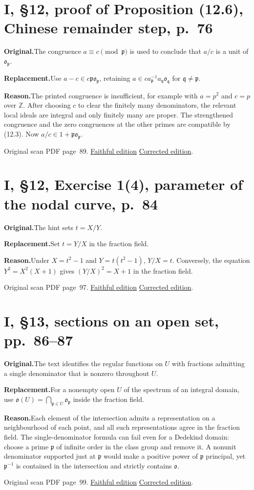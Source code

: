 \documentclass[11pt,a4paper]{article}
\newcommand{\original}{\par\smallskip\noindent\textbf{Original.}\enspace}
\newcommand{\replacement}{\par\smallskip\noindent\textbf{Replacement.}\enspace}
\newcommand{\reason}{\par\smallskip\noindent\textbf{Reason.}\enspace}
\newcommand{\editionlink}[3]{\href{#1\#errata.#2}{#3}}
\newcommand{\location}[2]{%
  \par\smallskip\noindent Original scan PDF page~#2.\enspace
  \editionlink{Neukirch_Faithful.pdf}{#1}{Faithful edition}
  \quad\editionlink{Neukirch_Corrected.pdf}{#1}{Corrected edition}.}
\begin{document}
\setcounter{section}{50}
\section{I, \S12, proof of Proposition (12.6), Chinese remainder step, p.~76}\label{errata:item:51}

\original The congruence $a\equiv c\pmod{\mathfrak p}$ is used to conclude that $a/c$ is a unit of $\mathfrak o_{\mathfrak p}$.
\replacement Use $a-c\in c\mathfrak p\mathfrak o_{\mathfrak p}$, retaining $a\in ca_{\mathfrak p}^{-1}a_{\mathfrak q}\mathfrak o_{\mathfrak q}$ for $\mathfrak q\ne\mathfrak p$.
\reason The printed congruence is insufficient, for example with $a=p^2$ and $c=p$ over $\mathbb Z$. After choosing $c$ to clear the finitely many denominators, the relevant local ideals are integral and only finitely many are proper. The strengthened congruence and the zero congruences at the other primes are compatible by (12.3). Now $a/c\in1+\mathfrak p\mathfrak o_{\mathfrak p}$.
\location{51}{89}

\setcounter{section}{51}
\section{I, \S12, Exercise 1(4), parameter of the nodal curve, p.~84}\label{errata:item:52}

\original The hint sets $t=X/Y$.
\replacement Set $t=Y/X$ in the fraction field.
\reason Under $X=t^2-1$ and $Y=t(t^2-1)$, $Y/X=t$. Conversely, the equation $Y^2=X^2(X+1)$ gives $(Y/X)^2=X+1$ in the fraction field.
\location{52}{97}

\setcounter{section}{52}
\section{I, \S13, sections on an open set, pp.~86--87}\label{errata:item:53}

\original The text identifies the regular functions on $U$ with fractions admitting a single denominator that is nonzero throughout $U$.
\replacement For a nonempty open $U$ of the spectrum of an integral domain, use $\mathfrak o(U)=\bigcap_{\mathfrak p\in U}\mathfrak o_{\mathfrak p}$ inside the fraction field.
\reason Each element of the intersection admits a representation on a neighbourhood of each point, and all such representations agree in the fraction field. The single-denominator formula can fail even for a Dedekind domain: choose a prime $\mathfrak p$ of infinite order in the class group and remove it. A nonunit denominator supported just at $\mathfrak p$ would make a positive power of $\mathfrak p$ principal, yet $\mathfrak p^{-1}$ is contained in the intersection and strictly contains $\mathfrak o$.
\location{53}{99}
\end{document}
